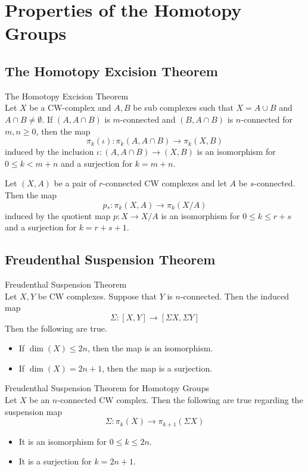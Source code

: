 \documentclass[a4paper]{article}
\begin{document}
\pagebreak
\section{Properties of the Homotopy Groups}
\subsection{The Homotopy Excision Theorem}
\begin{thm}{The Homotopy Excision Theorem}{}\\
Let $X$ be a CW-complex and $A,B$ be sub complexes such that $X=A\cup B$ and $A\cap B\neq\emptyset$. If $(A,A\cap B)$ is $m$-connected and $(B,A\cap B)$ is $n$-connected for $m,n\geq 0$, then the map $$\pi_k(\iota):\pi_k(A,A\cap B)\to\pi_k(X,B)$$ induced by the inclusion $\iota:(A,A\cap B)\to(X,B)$ is an isomorphism for $0\leq k<m+n$ and a surjection for $k=m+n$. 
\end{thm}

\begin{prp}{}{} Let $(X,A)$ be a pair of $r$-connected CW complexes and let $A$ be $s$-connected. Then the map $$p_\ast:\pi_k(X,A)\to\pi_k(X/A)$$ induced by the quotient map $p:X\to X/A$ is an isomorphism for $0\leq k\leq r+s$ and a surjection for $k=r+s+1$. 
\end{prp}

\subsection{Freudenthal Suspension Theorem}
\begin{thm}{Freudenthal Suspension Theorem}{}\\
Let $X,Y$ be CW complexes. Suppose that $Y$ is $n$-connected. Then the induced map $$\Sigma:[X,Y]\to[\Sigma X,\Sigma Y]$$ Then the following are true. 
\begin{itemize}
\item If $\dim(X)\leq 2n$, then the map is an isomorphism. 
\item If $\dim(X)=2n+1$, then the map is a surjection. 
\end{itemize}
\end{thm}

\begin{crl}{Freudenthal Suspension Theorem for Homotopy Groups}{}\\
Let $X$ be an $n$-connected CW complex. Then the following are true regarding the suspension map $$\Sigma:\pi_k(X)\to\pi_{k+1}(\Sigma X)$$
\begin{itemize}
\item It is an isomorphism for $0\leq k\leq 2n$. 
\item It is a surjection for $k=2n+1$. 
\end{itemize}
\end{crl}
\end{document}
